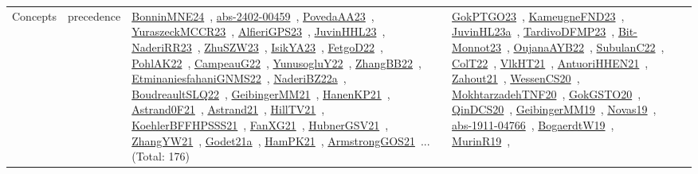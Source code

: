 {\begin{longtable}{lp{3cm}>{\raggedright\arraybackslash}p{6cm}>{\raggedright\arraybackslash}p{6cm}>{\raggedright\arraybackslash}p{8cm}}
Concepts & precedence & \href{../works/BonninMNE24.pdf}{BonninMNE24}~\cite{BonninMNE24}, \href{../works/abs-2402-00459.pdf}{abs-2402-00459}~\cite{abs-2402-00459}, \href{../works/PovedaAA23.pdf}{PovedaAA23}~\cite{PovedaAA23}, \href{../works/YuraszeckMCCR23.pdf}{YuraszeckMCCR23}~\cite{YuraszeckMCCR23}, \href{../works/AlfieriGPS23.pdf}{AlfieriGPS23}~\cite{AlfieriGPS23}, \href{../works/JuvinHHL23.pdf}{JuvinHHL23}~\cite{JuvinHHL23}, \href{../works/NaderiRR23.pdf}{NaderiRR23}~\cite{NaderiRR23}, \href{../works/ZhuSZW23.pdf}{ZhuSZW23}~\cite{ZhuSZW23}, \href{../works/IsikYA23.pdf}{IsikYA23}~\cite{IsikYA23}, \href{../works/FetgoD22.pdf}{FetgoD22}~\cite{FetgoD22}, \href{../works/PohlAK22.pdf}{PohlAK22}~\cite{PohlAK22}, \href{../works/CampeauG22.pdf}{CampeauG22}~\cite{CampeauG22}, \href{../works/YunusogluY22.pdf}{YunusogluY22}~\cite{YunusogluY22}, \href{../works/ZhangBB22.pdf}{ZhangBB22}~\cite{ZhangBB22}, \href{../works/EtminaniesfahaniGNMS22.pdf}{EtminaniesfahaniGNMS22}~\cite{EtminaniesfahaniGNMS22}, \href{../works/NaderiBZ22a.pdf}{NaderiBZ22a}~\cite{NaderiBZ22a}, \href{../works/BoudreaultSLQ22.pdf}{BoudreaultSLQ22}~\cite{BoudreaultSLQ22}, \href{../works/GeibingerMM21.pdf}{GeibingerMM21}~\cite{GeibingerMM21}, \href{../works/HanenKP21.pdf}{HanenKP21}~\cite{HanenKP21}, \href{../works/Astrand0F21.pdf}{Astrand0F21}~\cite{Astrand0F21}, \href{../works/Astrand21.pdf}{Astrand21}~\cite{Astrand21}, \href{../works/HillTV21.pdf}{HillTV21}~\cite{HillTV21}, \href{../works/KoehlerBFFHPSSS21.pdf}{KoehlerBFFHPSSS21}~\cite{KoehlerBFFHPSSS21}, \href{../works/FanXG21.pdf}{FanXG21}~\cite{FanXG21}, \href{../works/HubnerGSV21.pdf}{HubnerGSV21}~\cite{HubnerGSV21}, \href{../works/ZhangYW21.pdf}{ZhangYW21}~\cite{ZhangYW21}, \href{../works/Godet21a.pdf}{Godet21a}~\cite{Godet21a}, \href{../works/HamPK21.pdf}{HamPK21}~\cite{HamPK21}, \href{../works/ArmstrongGOS21.pdf}{ArmstrongGOS21}~\cite{ArmstrongGOS21}... (Total: 176) & \href{../works/GokPTGO23.pdf}{GokPTGO23}~\cite{GokPTGO23}, \href{../works/KameugneFND23.pdf}{KameugneFND23}~\cite{KameugneFND23}, \href{../works/JuvinHL23a.pdf}{JuvinHL23a}~\cite{JuvinHL23a}, \href{../works/TardivoDFMP23.pdf}{TardivoDFMP23}~\cite{TardivoDFMP23}, \href{../works/Bit-Monnot23.pdf}{Bit-Monnot23}~\cite{Bit-Monnot23}, \href{../works/OujanaAYB22.pdf}{OujanaAYB22}~\cite{OujanaAYB22}, \href{../works/SubulanC22.pdf}{SubulanC22}~\cite{SubulanC22}, \href{../works/ColT22.pdf}{ColT22}~\cite{ColT22}, \href{../works/VlkHT21.pdf}{VlkHT21}~\cite{VlkHT21}, \href{../works/AntuoriHHEN21.pdf}{AntuoriHHEN21}~\cite{AntuoriHHEN21}, \href{../works/Zahout21.pdf}{Zahout21}~\cite{Zahout21}, \href{../works/WessenCS20.pdf}{WessenCS20}~\cite{WessenCS20}, \href{../works/MokhtarzadehTNF20.pdf}{MokhtarzadehTNF20}~\cite{MokhtarzadehTNF20}, \href{../works/GokGSTO20.pdf}{GokGSTO20}~\cite{GokGSTO20}, \href{../works/QinDCS20.pdf}{QinDCS20}~\cite{QinDCS20}, \href{../works/GeibingerMM19.pdf}{GeibingerMM19}~\cite{GeibingerMM19}, \href{../works/Novas19.pdf}{Novas19}~\cite{Novas19}, \href{../works/abs-1911-04766.pdf}{abs-1911-04766}~\cite{abs-1911-04766}, \href{../works/BogaerdtW19.pdf}{BogaerdtW19}~\cite{BogaerdtW19}, \href{../works/MurinR19.pdf}{MurinR19}~\cite{MurinR19}, 
\end{longtable}}
